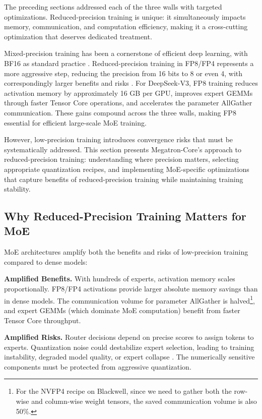 \documentclass[10pt,logo,copyright]{nvidiatechreport}
\begin{document}
The preceding sections addressed each of the three walls with targeted optimizations. Reduced-precision training is unique: it simultaneously impacts memory, communication, and computation efficiency, making it a cross-cutting optimization that deserves dedicated treatment.

Mixed-precision training has been a cornerstone of efficient deep learning, with BF16 as standard practice \cite{micikevicius2018mixed,peng2023fp8lmtrainingfp8large,xi2024coat}. Reduced-precision training in FP8/FP4 represents a more aggressive step, reducing the precision from 16 bits to 8 or even 4, with correspondingly larger benefits and risks \cite{micikevicius2022fp8formatsdeeplearning,fishman2025scalingfp8trainingtrilliontoken}. For DeepSeek-V3, FP8 training reduces activation memory by approximately 16 GB per GPU, improves expert GEMMs through faster Tensor Core operations, and accelerates the parameter AllGather communication. These gains compound across the three walls, making FP8 essential for efficient large-scale MoE training.

However, low-precision training introduces convergence risks that must be systematically addressed. This section presents Megatron-Core's approach to reduced-precision training: understanding where precision matters, selecting appropriate quantization recipes, and implementing MoE-specific optimizations that capture benefits of reduced-precision training while maintaining training stability.

\subsection{Why Reduced-Precision Training Matters for MoE}\label{sec:precision-anatomy}

MoE architectures amplify both the benefits and risks of low-precision training compared to dense models:

\textbf{Amplified Benefits.} With hundreds of experts, activation memory scales proportionally. FP8/FP4 activations provide larger absolute memory savings than in dense models. The communication volume for parameter AllGather is halved\footnote{For the NVFP4 recipe on Blackwell, since we need to gather both the row-wise and column-wise weight tensors, the saved communication volume is also 50\%.}, and expert GEMMs (which dominate MoE computation) benefit from faster Tensor Core throughput.

\textbf{Amplified Risks.} Router decisions depend on precise scores to assign tokens to experts. Quantization noise could destabilize expert selection, leading to training instability, degraded model quality, or expert collapse \cite{nagel2021whitepaper}. The numerically sensitive components must be protected from aggressive quantization.
\end{document}
